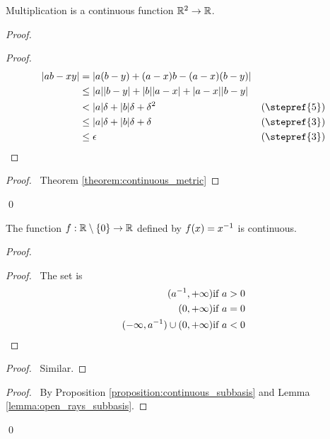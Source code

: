 \begin{theorem}
    Multiplication is a continuous function $\mathbb{R}^2 \rightarrow \mathbb{R}$.
\end{theorem}

\begin{proof}
    \pf
    \begin{proof}
        \pf
        \begin{align*}
            |ab - xy| & = |a(b-y) + (a-x)b - (a-x)(b-y)| \\
            & \leq |a| |b-y| + |b| |a-x| + |a-x| |b-y| \\
            & < |a| \delta + |b| \delta + \delta^2 & (\text{\stepref{5}})\\
            & \leq |a| \delta + |b| \delta + \delta & (\text{\stepref{3}})\\
            & \leq \epsilon & (\text{\stepref{3}})
        \end{align*}
    \end{proof}
    \qedstep
    \begin{proof}
        \pf\ Theorem \ref{theorem:continuous_metric}
    \end{proof}
    \qed
\end{proof}

\begin{theorem}
    The function $f : \mathbb{R} \setminus \{ 0 \} \rightarrow \mathbb{R}$ defined by $f(x) = {x}^{-1}$ is continuous.
\end{theorem}

\begin{proof}
    \pf
    \begin{proof}
        \pf\ The set is
        \begin{align*}
            ({a}^{-1}, + \infty) & \text{if } a > 0 \\
            (0, + \infty) & \text{if } a = 0 \\
            (- \infty, {a}^{-1}) \cup (0, + \infty) & \text{if } a < 0
        \end{align*}
    \end{proof}
    \begin{proof}
        \pf\ Similar.
    \end{proof}
    \qedstep
    \begin{proof}
        \pf\ By Proposition \ref{proposition:continuous_subbasis} and Lemma
        \ref{lemma:open_rays_subbasis}.
    \end{proof}
    \qed
\end{proof}

